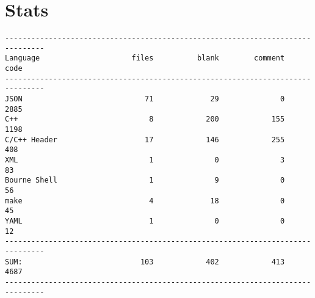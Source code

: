 \documentclass[paper=a4, fontsize=11pt, abstract=on]{scrartcl} %
\numberwithin{equation}{section} %
\numberwithin{figure}{section} %
\numberwithin{table}{section} %
\begin{document}
\section{Stats}

\begin{verbatim}
-------------------------------------------------------------------------------
Language                     files          blank        comment           code
-------------------------------------------------------------------------------
JSON                            71             29              0           2885
C++                              8            200            155           1198
C/C++ Header                    17            146            255            408
XML                              1              0              3             83
Bourne Shell                     1              9              0             56
make                             4             18              0             45
YAML                             1              0              0             12
-------------------------------------------------------------------------------
SUM:                           103            402            413           4687
-------------------------------------------------------------------------------
\end{verbatim}
\end{document}
